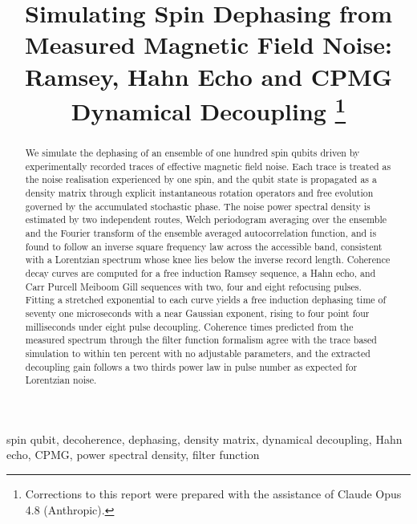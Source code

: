 \documentclass[conference]{IEEEtran}
\begin{document}
\title{Simulating Spin Dephasing from Measured Magnetic Field Noise:\\
Ramsey, Hahn Echo and CPMG Dynamical Decoupling
\thanks{Corrections to this report were
prepared with the assistance of Claude Opus 4.8 (Anthropic).}}

\author{
}

\maketitle

\begin{abstract}
We simulate the dephasing of an ensemble of one hundred spin qubits driven by
experimentally recorded traces of effective magnetic field noise. Each trace is
treated as the noise realisation experienced by one spin, and the qubit state is
propagated as a density matrix through explicit instantaneous rotation operators
and free evolution governed by the accumulated stochastic phase. The noise power
spectral density is estimated by two independent routes, Welch periodogram
averaging over the ensemble and the Fourier transform of the ensemble averaged
autocorrelation function, and is found to follow an inverse square frequency law
across the accessible band, consistent with a Lorentzian spectrum whose knee lies
below the inverse record length. Coherence decay curves are computed for a free
induction Ramsey sequence, a Hahn echo, and Carr Purcell Meiboom Gill sequences
with two, four and eight refocusing pulses. Fitting a stretched exponential to
each curve yields a free induction dephasing time of seventy one microseconds
with a near Gaussian exponent, rising to four point four milliseconds under eight
pulse decoupling. Coherence times predicted from the measured spectrum through
the filter function formalism agree with the trace based simulation to within ten
percent with no adjustable parameters, and the extracted decoupling gain follows a
two thirds power law in pulse number as expected for Lorentzian noise.
\end{abstract}

\begin{IEEEkeywords}
spin qubit, decoherence, dephasing, density matrix, dynamical decoupling, Hahn
echo, CPMG, power spectral density, filter function
\end{IEEEkeywords}
\end{document}
